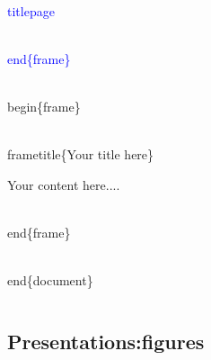 \documentclass[10pt]{beamer}
\newcommand{\words}{\textcolor{blue}}
\begin{document}
\begin{frame}
\begin{columns}
\begin{column}{0.6\textwidth}
\begin{semiverbatim}
\words{\\titlepage}

\words{\\end\{frame\}}

\\begin\{frame\}

\\frametitle\{Your title here\}
 
 Your content here....

\\end\{frame\}

\\end\{document\}
  
\end{semiverbatim}

 \end{column}
 

       \end{columns}


\end{frame}

\subsection{Presentations:figures}
\end{document}
